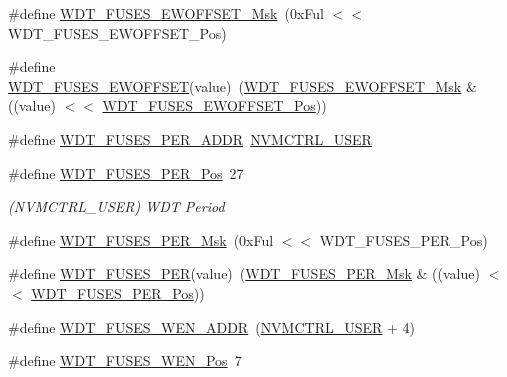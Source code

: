 \begin{DoxyCompactItemize}
\#define \mbox{\hyperlink{group__fuses__api_ga7acf63462b40241031a53d6ecf5a0d69}{W\+D\+T\+\_\+\+F\+U\+S\+E\+S\+\_\+\+E\+W\+O\+F\+F\+S\+E\+T\+\_\+\+Msk}}~(0x\+Ful $<$$<$ W\+D\+T\+\_\+\+F\+U\+S\+E\+S\+\_\+\+E\+W\+O\+F\+F\+S\+E\+T\+\_\+\+Pos)
\item 
\#define \mbox{\hyperlink{group__fuses__api_ga97578a46129ba8e2a78d9c2d7e15186e}{W\+D\+T\+\_\+\+F\+U\+S\+E\+S\+\_\+\+E\+W\+O\+F\+F\+S\+ET}}(value)~(\mbox{\hyperlink{group__fuses__api_ga7acf63462b40241031a53d6ecf5a0d69}{W\+D\+T\+\_\+\+F\+U\+S\+E\+S\+\_\+\+E\+W\+O\+F\+F\+S\+E\+T\+\_\+\+Msk}} \& ((value) $<$$<$ \mbox{\hyperlink{group__fuses__api_gae2f89f15eabc293811402651af74d059}{W\+D\+T\+\_\+\+F\+U\+S\+E\+S\+\_\+\+E\+W\+O\+F\+F\+S\+E\+T\+\_\+\+Pos}}))
\item 
\#define \mbox{\hyperlink{group__fuses__api_ga2c50bf4f2c97da8a4a6ae114cc9c0c69}{W\+D\+T\+\_\+\+F\+U\+S\+E\+S\+\_\+\+P\+E\+R\+\_\+\+A\+D\+DR}}~\mbox{\hyperlink{group___s_a_m_d21_j18_a__base_ga7a7a83a5753fa323b61536e396083c99}{N\+V\+M\+C\+T\+R\+L\+\_\+\+U\+S\+ER}}
\item 
\#define \mbox{\hyperlink{group__fuses__api_ga87db8b2566c9dd04e5c0cb3838175952}{W\+D\+T\+\_\+\+F\+U\+S\+E\+S\+\_\+\+P\+E\+R\+\_\+\+Pos}}~27
\begin{DoxyCompactList}\small\item\em (N\+V\+M\+C\+T\+R\+L\+\_\+\+U\+S\+ER) W\+DT Period \end{DoxyCompactList}\item 
\#define \mbox{\hyperlink{group__fuses__api_ga8c0047dcebe5a6775a5f141a9f1e1342}{W\+D\+T\+\_\+\+F\+U\+S\+E\+S\+\_\+\+P\+E\+R\+\_\+\+Msk}}~(0x\+Ful $<$$<$ W\+D\+T\+\_\+\+F\+U\+S\+E\+S\+\_\+\+P\+E\+R\+\_\+\+Pos)
\item 
\#define \mbox{\hyperlink{group__fuses__api_gadea5dd3449831980a604a0fe3dd323cb}{W\+D\+T\+\_\+\+F\+U\+S\+E\+S\+\_\+\+P\+ER}}(value)~(\mbox{\hyperlink{group__fuses__api_ga8c0047dcebe5a6775a5f141a9f1e1342}{W\+D\+T\+\_\+\+F\+U\+S\+E\+S\+\_\+\+P\+E\+R\+\_\+\+Msk}} \& ((value) $<$$<$ \mbox{\hyperlink{group__fuses__api_ga87db8b2566c9dd04e5c0cb3838175952}{W\+D\+T\+\_\+\+F\+U\+S\+E\+S\+\_\+\+P\+E\+R\+\_\+\+Pos}}))
\item 
\#define \mbox{\hyperlink{group__fuses__api_ga9c4f3a13c1cdf6a6f975e5dc304427fc}{W\+D\+T\+\_\+\+F\+U\+S\+E\+S\+\_\+\+W\+E\+N\+\_\+\+A\+D\+DR}}~(\mbox{\hyperlink{group___s_a_m_d21_j18_a__base_ga7a7a83a5753fa323b61536e396083c99}{N\+V\+M\+C\+T\+R\+L\+\_\+\+U\+S\+ER}} + 4)
\item 
\#define \mbox{\hyperlink{group__fuses__api_ga87c9e50a26f5095b90217f854536d90f}{W\+D\+T\+\_\+\+F\+U\+S\+E\+S\+\_\+\+W\+E\+N\+\_\+\+Pos}}~7

\end{DoxyCompactItemize}
